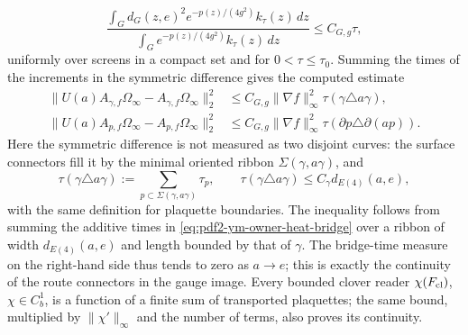 \begin{equation}\label{eq:pdf2-ym-owner-gibbs-heat-moment}
 \frac{\int_Gd_G(z,e)^2e^{-p(z)/(4g^2)}k_\tau(z)\,dz}
      {\int_Ge^{-p(z)/(4g^2)}k_\tau(z)\,dz}
 \le C_{G,g}\tau,
\end{equation}
uniformly over screens in a compact set and for $0<\tau\le\tau_0$.
Summing the times of the increments in the symmetric difference gives the
computed estimate
\begin{equation}\label{eq:pdf2-ym-owner-holonomy-e4-estimate}
 \begin{aligned}
 \|U(a)A_{\gamma,f}\Omega_\infty-A_{\gamma,f}\Omega_\infty\|_2^2
 &\le C_{G,g}\|\nabla f\|_\infty^2
     \tau(\gamma\triangle a\gamma),\\
 \|U(a)A_{p,f}\Omega_\infty-A_{p,f}\Omega_\infty\|_2^2
 &\le C_{G,g}\|\nabla f\|_\infty^2
     \tau(\partial p\triangle\partial(ap)).
 \end{aligned}
\end{equation}
Here the symmetric difference is not measured as two disjoint curves: the surface
connectors fill it by the minimal oriented ribbon
$\Sigma(\gamma,a\gamma)$, and
\begin{equation}\label{eq:pdf2-ym-owner-bridge-time-ribbon}
 \tau(\gamma\triangle a\gamma)
 :=\sum_{p\subset\Sigma(\gamma,a\gamma)}\tau_p,
 \qquad
 \tau(\gamma\triangle a\gamma)
 \le C_\gamma d_{E(4)}(a,e),
\end{equation}
with the same definition for plaquette boundaries. The inequality follows from
summing the additive times in \eqref{eq:pdf2-ym-owner-heat-bridge} over a ribbon
of width $d_{E(4)}(a,e)$ and length bounded by that of $\gamma$.
The bridge-time measure on the right-hand side thus tends to zero as $a\to e$;
this is exactly the continuity of the route connectors in the gauge image.
Every bounded clover reader $\chi(F_{\rm cl})$, $\chi\in C_b^1$, is a function of a
finite sum of transported plaquettes; the same bound, multiplied by
$\|\chi'\|_\infty$ and the number of terms, also proves its continuity.


